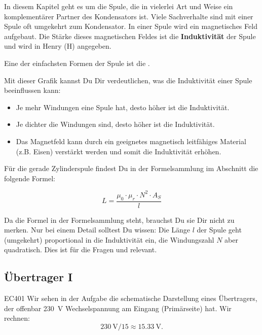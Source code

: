 \begin{ohmchapter}
  In diesem Kapitel geht es um die Spule, die in vielerlei Art und Weise ein komplementärer Partner des Kondensators ist. Viele Sachverhalte sind mit einer Spule oft umgekehrt zum Kondensator.
  In einer Spule wird ein magnetisches Feld aufgebaut. Die Stärke dieses magnetischen Feldes ist die \textbf{Induktivität} der Spule und wird in Henry (H) angegeben.

  Eine der einfachsten Formen der Spule ist die .


  Mit dieser Grafik kannst Du Dir verdeutlichen, was die Induktivität einer Spule beeinflussen kann:

  \begin{itemize}
    \item Je mehr Windungen eine Spule hat, desto höher ist die Induktivität.
    \item Je dichter die Windungen sind, desto höher ist die Induktivität.
    \item Das Magnetfeld kann durch ein geeignetes magnetisch leitfähiges Material (z.B. Eisen) verstärkt werden und somit die Induktivität erhöhen.
  \end{itemize}
  Für die gerade Zylinderspule findest Du in der Formelsammlung im Abschnitt  die folgende Formel:

  $$ L = \frac{\mu_0 \cdot \mu_r \cdot N^2 \cdot A_S }{l}$$

  Da die Formel in der Formelsammlung steht, brauchst Du sie Dir nicht zu merken. Nur bei einem Detail solltest Du wissen: Die Länge $l$ der Spule geht (umgekehrt) proportional in die Induktivität ein, die Windungszahl $N$ aber quadratisch. Dies ist für die Fragen  und  relevant.

\end{ohmchapter}

\subsection{Übertrager I}

\begin{sol}{EC401}
  Wir sehen in der Aufgabe die schematische Darstellung eines Übertragers, der offenbar \SI{230}{\volt} Wechselspannung am Eingang (Primärseite) hat.
  Wir rechnen:
  $$ \SI{230}{\volt} / 15 \approx \SI{15.33}{\volt}.$$
\end{sol}

